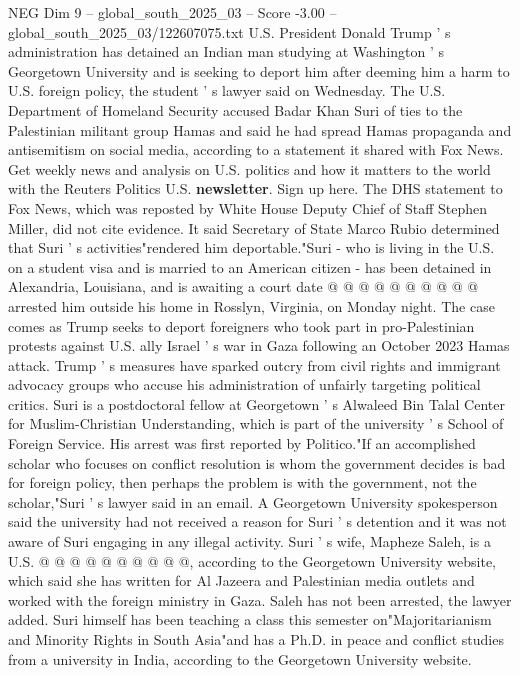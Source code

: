 \begin{textsample}{NEG Dim 9 – global\_south\_2025\_03 – Score -3.00 – global\_south\_2025\_03/122607075.txt}  \label{ex:f9_neg_317}
U.S.
President Donald Trump ' s administration has detained an Indian man studying at Washington ' s Georgetown University and is seeking to deport him after deeming him a harm to U.S. foreign policy, the student ' s lawyer said on Wednesday.
The U.S.
Department of Homeland Security accused Badar Khan Suri of ties to the Palestinian militant group Hamas and said he had spread Hamas propaganda and antisemitism on social media, according to a statement it shared with Fox News.
Get weekly news and analysis on U.S. politics and how it matters to the world with the Reuters Politics U.S. \textbf{newsletter}.
Sign up here.
The DHS statement to Fox News, which was reposted by White House Deputy Chief of Staff Stephen Miller, did not cite evidence.
It said Secretary of State Marco Rubio determined that Suri ' s activities"rendered him deportable."Suri - who is living in the U.S. on a student visa and is married to an American citizen - has been detained in Alexandria, Louisiana, and is awaiting a court date @ @ @ @ @ @ @ @ @ @ arrested him outside his home in Rosslyn, Virginia, on Monday night.
The case comes as Trump seeks to deport foreigners who took part in pro-Palestinian protests against U.S. ally Israel ' s war in Gaza following an October 2023 Hamas attack.
Trump ' s measures have sparked outcry from civil rights and immigrant advocacy groups who accuse his administration of unfairly targeting political critics.
Suri is a postdoctoral fellow at Georgetown ' s Alwaleed Bin Talal Center for Muslim-Christian Understanding, which is part of the university ' s School of Foreign Service.
His arrest was first reported by Politico."If an accomplished scholar who focuses on conflict resolution is whom the government decides is bad for foreign policy, then perhaps the problem is with the government, not the scholar,"Suri ' s lawyer said in an email.
A Georgetown University spokesperson said the university had not received a reason for Suri ' s detention and it was not aware of Suri engaging in any illegal activity.
Suri ' s wife, Mapheze Saleh, is a U.S. @ @ @ @ @ @ @ @ @ @, according to the Georgetown University website, which said she has written for Al Jazeera and Palestinian media outlets and worked with the foreign ministry in Gaza.
Saleh has not been arrested, the lawyer added.
Suri himself has been teaching a class this semester on"Majoritarianism and Minority Rights in South Asia"and has a Ph.D. in peace and conflict studies from a university in India, according to the Georgetown University website.

\end{textsample}
